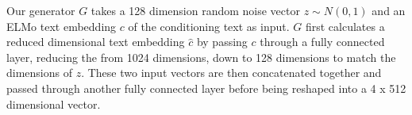 Our generator $G$ takes a 128 dimension random noise vector $z \sim N(0, 1)$ and an ELMo text embedding $c$ of the conditioning text as input. $G$ first calculates a reduced dimensional text embedding $\hat{c}$ by passing $c$ through a fully connected layer, reducing the  from 1024 dimensions, down to 128 dimensions to match the dimensions of $z$. These two input vectors are then concatenated together and passed through another fully connected layer before being reshaped into a 4 x 512 dimensional vector.
